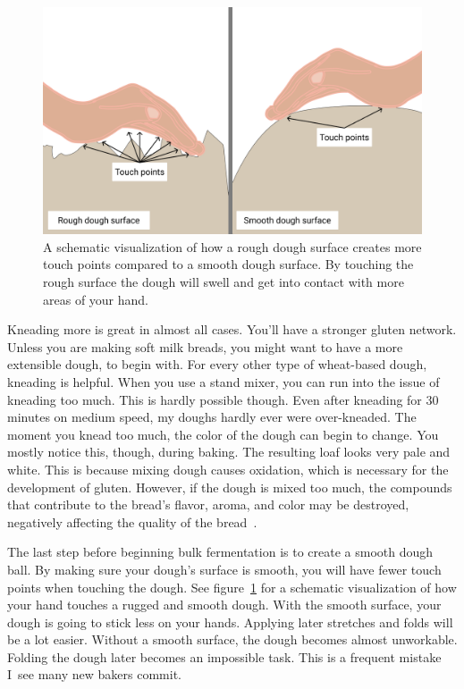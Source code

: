 \begin{figure}[!htb]
  \includegraphics[width=\textwidth]{dough-surface-touchpoints}
  \caption{A schematic visualization of how a rough dough surface
  creates more touch points compared to a smooth dough surface.
  By touching the rough surface the dough will swell and get into
  contact with more areas of your hand.}%
  \label{fig:dough-touch-points}
\end{figure}

Kneading more is great in almost all cases. You'll have a stronger
gluten network. Unless you are making soft milk breads, you
might want to have a more extensible dough, to begin with. For every
other type of wheat-based dough, kneading is helpful. When you use
a stand mixer, you can run into the issue of kneading too much. This
is hardly possible though. Even after kneading for 30 minutes on medium
speed, my doughs hardly ever were over-kneaded. The moment you knead
too much, the color of the dough can begin to change. You mostly
notice this, though, during baking. The resulting loaf looks very
pale and white. This is because mixing dough causes oxidation,
which is necessary for the development of gluten.
However, if the dough is mixed too much, the compounds that contribute
to the bread's flavor, aroma, and color may be destroyed, negatively
affecting the quality of the bread~\cite{oxidization+dough}.

The last step before beginning bulk fermentation is to
create a smooth dough ball. By making sure your dough's surface is
smooth, you will have fewer touch points when touching the dough.
See figure~\ref{fig:dough-touch-points} for a schematic visualization
of how your hand touches a rugged and smooth dough.
With the smooth surface, your dough is going to stick less on your hands. Applying
later stretches and folds will be a lot easier. Without a smooth
surface, the dough becomes almost unworkable. Folding the dough later
becomes an impossible task. This is a frequent mistake I~see many
new bakers commit.

